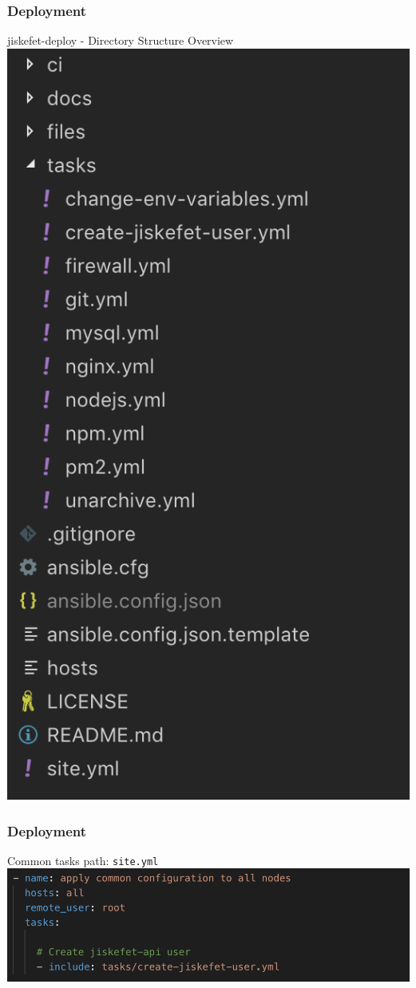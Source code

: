 \documentclass[12pt]{beamer}
\begin{document}
    \begin{frame}
        \frametitle{Deployment}
        jiskefet-deploy - Directory Structure Overview
        \newline
   		\includegraphics[scale=.40]{assets/deploy_dirstruct.png}
    \end{frame}

    \begin{frame}
        \frametitle{Deployment}
        Common tasks
        \newline
        path: \texttt{site.yml}
        \newline
   		\includegraphics[scale=.40]{assets/deploy_create_user.png}
    \end{frame}
    
\end{document}
